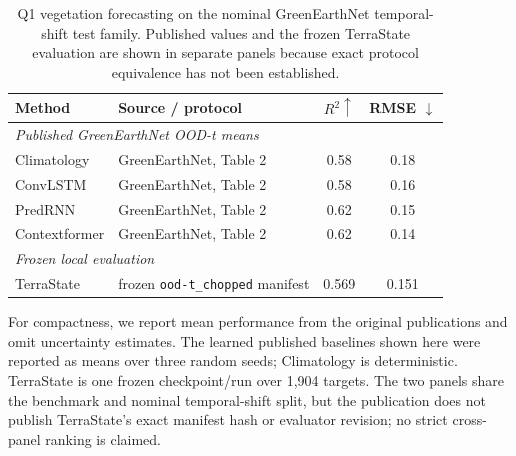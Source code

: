 \begin{table}[t]
\centering
\small
\caption{Q1 vegetation forecasting on the nominal GreenEarthNet temporal-shift
test family. Published values and the frozen TerraState evaluation are shown in
separate panels because exact protocol equivalence has not been established.}
\label{tab:q1_public_forecasting}
\begin{tabular}{llcc}
\toprule
Method & Source / protocol & $R^2 \uparrow$ & RMSE $\downarrow$ \\
\midrule
\multicolumn{4}{l}{\emph{Published GreenEarthNet OOD-t means}} \\
Climatology  & GreenEarthNet, Table 2 & 0.58 & 0.18 \\
ConvLSTM     & GreenEarthNet, Table 2 & 0.58 & 0.16 \\
PredRNN      & GreenEarthNet, Table 2 & 0.62 & 0.15 \\
Contextformer& GreenEarthNet, Table 2 & 0.62 & 0.14 \\
\midrule
\multicolumn{4}{l}{\emph{Frozen local evaluation}} \\
TerraState & frozen \texttt{ood-t\_chopped} manifest & 0.569 & 0.151 \\
\bottomrule
\end{tabular}

\vspace{2pt}
\parbox{0.98\linewidth}{\footnotesize
For compactness, we report mean performance from the original publications and
omit uncertainty estimates. The learned published baselines shown here were
reported as means over three random seeds; Climatology is deterministic.
TerraState is one frozen checkpoint/run over 1,904 targets. The two panels share
the benchmark and nominal temporal-shift split, but the publication does not
publish TerraState's exact manifest hash or evaluator revision; no strict
cross-panel ranking is claimed.}
\end{table}
